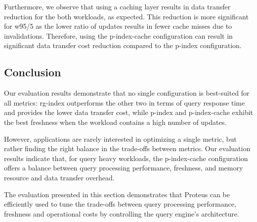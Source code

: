 Furthermore, we observe that using a caching layer results in data transfer reduction for the both workloads, as expected.
This reduction is more significant for w95/5 as the lower ratio of updates results in fewer cache misses due to invalidations.
Therefore, using the p-index-cache configuration can result in significant data transfer cost reduction compared to
the p-index configuration.

\subsection{Conclusion}



Our evaluation results demonstrate that no single configuration is best-suited for
all metrics:
rg-index outperforms the other two in terms of query response time and provides the lower data transfer cost,
while p-index and p-index-cache exhibit the best freshness when the workload contains
a high number of updates.

However, applications are rarely interested in optimizing a single metric,
but rather finding the right balance in the trade-offs between metrics.
Our evaluation results indicate that, for query heavy workloads,
the p-index-cache configuration offers a balance between query processing performance,
freshness, and memory resource and data transfer overhead.

The evaluation presented in this section demonstrates that Proteus can
be efficiently used to tune the trade-offs between query processing performance,
freshness and operational costs by controlling the query engine's architecture.

